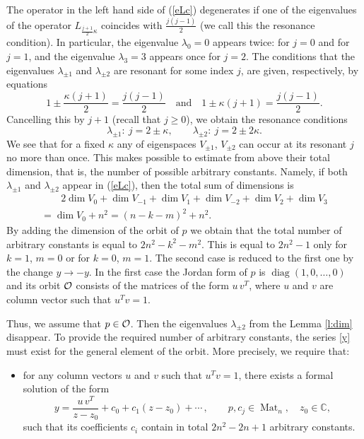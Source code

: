 \documentclass{article}
\theoremstyle{plain}
\theoremstyle{definition}
\DeclareMathOperator{\diag}{diag}
\DeclareMathOperator{\Mat}{Mat}
\begin{document}
The operator in the left hand side of (\ref{eLc}) degenerates if one of the eigenvalues of the operator $L_{\frac{j+1}{2}\kappa}$ coincides with $\frac{j(j-1)}{2}$ (we call this the resonance condition). In particular, the eigenvalue $\lambda_0=0$ appears twice: for $j=0$ and for $j=1$, and the eigenvalue $\lambda_3=3$ appears once for $j=2$. The conditions that the eigenvalues $\lambda_{\pm1}$ and $\lambda_{\pm2}$ are resonant for some index $j$, are given, respectively, by equations
\[
 1\pm \frac{\kappa (j+1)}{2}=\frac{j(j-1)}{2} \quad\text{and}\quad
 1\pm \kappa (j+1)=\frac{j(j-1)}{2}.
\]
Cancelling this by $j+1$ (recall that $j\ge0$), we obtain the resonance conditions
\[
 \lambda_{\pm1}:~ j=2 \pm \kappa,\qquad
 \lambda_{\pm2}:~ j=2 \pm 2\kappa.
\]
We see that for a fixed $\kappa$ any of eigenspaces $V_{\pm 1}$, $V_{\pm 2}$ can occur at its resonant $j$ no more than once. This makes possible to estimate from above their total dimension, that is, the number of possible arbitrary constants. Namely, if both $\lambda_{\pm1}$ and $\lambda_{\pm2}$ appear in (\ref{eLc}), then the total sum of dimensions is
\begin{multline*}
 \qquad 2\dim V_0+\dim V_{-1}+\dim V_1+\dim V_{-2}+\dim V_2+\dim V_3\\
 = \dim V_0 +n^2 = (n-k-m)^2+n^2.\qquad
\end{multline*}
By adding the dimension of the orbit of $p$ we obtain that the total number of arbitrary constants is equal to $2n^2-k^2-m^2$. This is equal to $2n^2-1$ only for $k=1$, $m=0$ or for $k=0$, $m=1$. The second case is reduced to the first one by the change $y\to -y$. In the first case the Jordan form of $p$ is $\diag(1,0,\dots,0)$ and its orbit ${\cal O}$ consists of the matrices of the form $u \, v^T$, where $u$ and $v$ are column vector such that $u^T v=1.$ 

Thus, we assume that $p\in {\cal O}$. Then the eigenvalues $\lambda_{\pm 2}$ from the Lemma \ref{l:dim} disappear. To provide the required number of arbitrary constants, the series \eqref{y} must exist for the general element of the orbit. More precisely, we require that:
\begin{itemize}
    \item for any column vectors $u$ and $v$ such that $u^T v=1$, there exists a formal solution of the form
    $$
 y=\frac{u\,v^T}{z-z_0}+c_0+c_1(z-z_0)+\cdots\,, \qquad 
 p,c_j \in\Mat_n,\quad z_0\in{\mathbb C},
    $$
such that its coefficients $c_i$ contain in total $2n^2-2n+1$ arbitrary constants.
\end{itemize}
\end{document}
